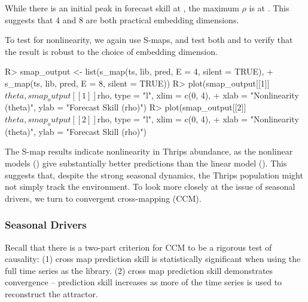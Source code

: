 \documentclass[article]{jss}
\begin{document}
\begin{Schunk}
\end{Schunk}

While there is an initial peak in forecast skill at , the maximum $\rho$ is at . This suggests that 4 and 8 are both practical embedding dimensions.

To test for nonlinearity, we again use S-maps, and test both  and  to verify that the result is robust to the choice of embedding dimension.


\begin{Schunk}
\begin{Sinput}
R> smap_output <- list(s_map(ts, lib, pred, E = 4, silent = TRUE),
+                      s_map(ts, lib, pred, E = 8, silent = TRUE))
R> plot(smap_output[[1]]$theta, smap_output[[1]]$rho, type = "l", xlim = c(0, 4),
+       xlab = "Nonlinearity (theta)", ylab = "Forecast Skill (rho)")
R> plot(smap_output[[2]]$theta, smap_output[[2]]$rho, type = "l", xlim = c(0, 4),
+       xlab = "Nonlinearity (theta)", ylab = "Forecast Skill (rho)")
\end{Sinput}
\end{Schunk}

The S-map results indicate nonlinearity in Thrips abundance, as the nonlinear models () give substantially better predictions than the linear model (). This suggests that, despite the strong seasonal dynamics, the Thrips population might not simply track the environment. To look more closely at the issue of seasonal drivers, we turn to convergent cross-mapping (CCM).

\subsubsection{Seasonal Drivers}\label{sec:thrips-seasonal-drivers}

Recall that there is a two-part criterion for CCM to be a rigorous test of causality: (1) cross map prediction skill is statistically significant when using the full time series as the library. (2) cross map prediction skill demonstrates convergence -- prediction skill increases as more of the time series is used to reconstruct the attractor.
\end{document}
